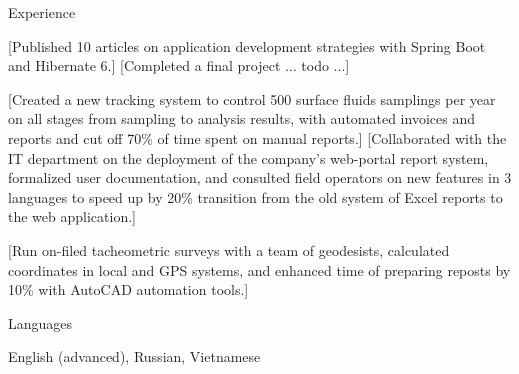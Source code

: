 \documentclass[10pt,a4paper,oneside]{letter} %
\begin{document}
	\begin{resumeSection}{Experience }

			[Published 10 articles on application development strategies with Spring Boot and Hibernate 6.]
			[Completed a final project ... todo ...]

			[Created a new tracking system to control 500 surface fluids samplings per year on all stages from sampling to analysis results, with automated invoices and reports and cut off 70\% of time spent on manual reports.]
			[Collaborated with the IT department on the deployment of the company's web-portal report system, formalized user documentation, and consulted field operators on new features in 3 languages to speed up by 20\% transition from the old system of Excel reports to the web application.]


			[Run on-filed tacheometric surveys with a team of geodesists, calculated coordinates in local and GPS systems, and enhanced time of preparing reposts by 10\% with AutoCAD automation tools.]
	\end{resumeSection}
	
	\begin{resumeSection}{Languages }

		English (advanced), Russian, Vietnamese
	\end{resumeSection}
	
\end{document}
